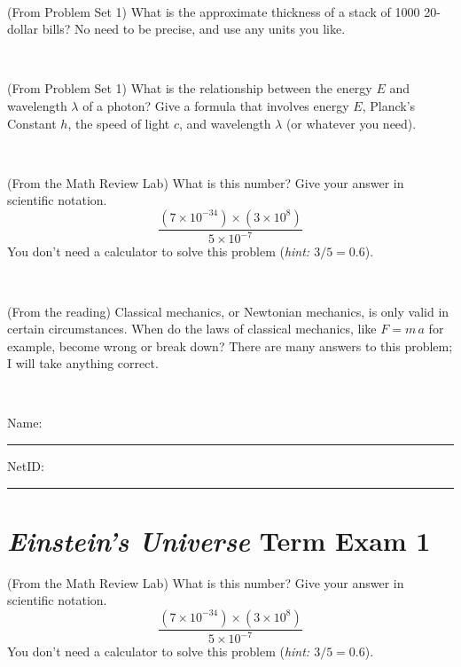 \documentclass[12pt, letterpaper]{article}
\begin{document}
\vfill ~


\clearpage


\begin{problem} (From Problem Set 1)
What is the approximate thickness of a stack of 1000 20-dollar bills?
No need to be precise, and use any units you like.
\end{problem}


\vfill ~

\begin{problem} (From Problem Set 1)
What is the relationship between the energy $E$ and wavelength
$\lambda$ of a photon? Give a formula that involves energy $E$,
Planck's Constant $h$, the speed of light $c$, and wavelength
$\lambda$ (or whatever you need).
\end{problem}

\vfill ~

\begin{problem} (From the Math Review Lab)
What is this number? Give your answer in scientific notation.
$$
\frac{(7\times10^{-34})\times(3\times10^8)}{5\times10^{-7}}
$$
You don't need a calculator to solve this problem (\textit{hint: $3/5=0.6$}).
\end{problem}


\vfill ~

\begin{problem} (From the reading)
Classical mechanics, or Newtonian mechanics, is only valid in certain
circumstances. When do the laws of classical mechanics, like $F =
m\,a$ for example, become wrong or break down? There are many answers
to this problem; I will take anything correct.
\end{problem}


\vfill ~


\cleardoublepage



\noindent
Name: \rule[-1ex]{0.60\textwidth}{0.1pt}
NetID: \rule[-1ex]{0.20\textwidth}{0.1pt}

\section*{\textsl{Einstein's Universe} Term Exam 1}
\setcounter{problem}{1}


\begin{problem} (From the Math Review Lab)
What is this number? Give your answer in scientific notation.
$$
\frac{(7\times10^{-34})\times(3\times10^8)}{5\times10^{-7}}
$$
You don't need a calculator to solve this problem (\textit{hint: $3/5=0.6$}).
\end{problem}
\end{document}
